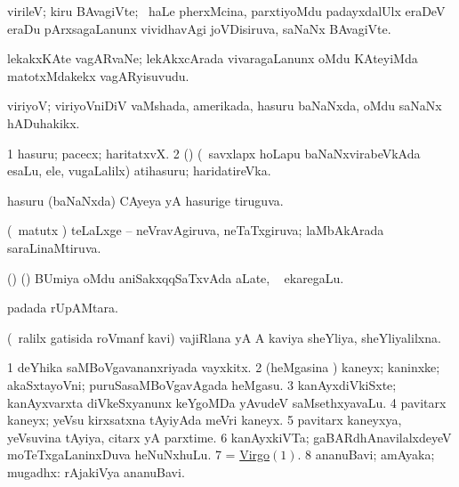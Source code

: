 \bentry
{} 
\gl{\nA}
\expl{}
\bmng
 virileV; kiru BAvagiVte; \kanmu\ haLe pherxMcina, parxtiyoMdu padayxdalUlx eraDeV eraDu pArxsagaLanunx vividhavAgi joVDisiruva, saNaNx BAvagiVte. 
\emng
\eentry

\bentry
{} 
\gl{\nA}
\expl{}
\bmng
 lekakxKAte vagARvaNe; lekAkxcArada vivaragaLanunx oMdu KAteyiMda matotxMdakekx vagARyisuvudu. 
\emng
\eentry

\bentry
{} 
\gl{\nA}
\bmng
 viriyoV; viriyoVniDiV vaMshada, amerikada, hasuru baNaNxda, oMdu saNaNx hADuhakikx.  
\emng
\eentry

\bentry
{} 
\gl{\nA}
\expl{}
\bmng
\bnum
\num{1} hasuru; pacecx; haritatxvX. 
\num{2} (\savi) (\sA\ savxlapx hoLapu baNaNxvirabeVkAda esaLu, ele, \mo vugaLalilx) atihasuru; haridatireVka. 
\enum
\emng
\eentry

\bentry
{} 
\gl{\gu}
\expl{}
\bmng
 hasuru (baNaNxda) CAyeya yA hasurige tiruguva. 
\emng
\eentry

\bentry
{} 
\gl{\gu}
\expl{}
\bmng
 (\savi\ matutx \pArxvi) teLaLxge -- neVravAgiruva, neTaTxgiruva; laMbAkArada saraLinaMtiruva. 
\emng
\eentry

\bentry
{} 
\gl{\nA}
\expl{}
\bmng
 (\birx) (\ca) BUmiya oMdu aniSakxqqSaTxvAda aLate, \kanmu\  ekaregaLu. 
\emng
\eentry

\bentry
{} 
\gl{\nA}
\expl{}
\bmng
  padada rUpAMtara. 
\emng
\eentry

\bentry
{} 
\gl{\gu}
\expl{}
\bmng
 (\kirxpU\ ralilx gatisida roVmanf kavi) vajiRlana yA A kaviya sheYliya, sheYliyalilxna. 
\emng
\eentry

\bentry
{} 
\gl{\nA}
\expl{}
\bmng
\bnum
\num{1} deYhika saMBoVgavananxriyada vayxkitx. 
\num{2} (heMgasina \vi) kaneyx; kaninxke; akaSxtayoVni; puruSasaMBoVgavAgada heMgasu. 
\num{3} kanAyxdiVkiSxte; kanAyxvarxta diVkeSxyanunx keYgoMDa yAvudeV saMsethxyavaLu. 
\hypertarget{virgin(4)}{} 
\num{4} pavitarx kaneyx; yeVsu kirxsatxna tAyiyAda meVri kaneyx. 
\num{5} pavitarx kaneyxya, yeVsuvina tAyiya, citarx yA parxtime. 
\num{6} kanAyxkiVTa; gaBARdhAnavilalxdeyeV moTeTxgaLaninxDuva heNuNxhuLu. 
\num{7} = \hyperlink{Virgo}{Virgo\((1)\)}. 
\num{8} ananuBavi; amAyaka; mugadhx:  rAjakiVya ananuBavi. 
\enum
\emng

